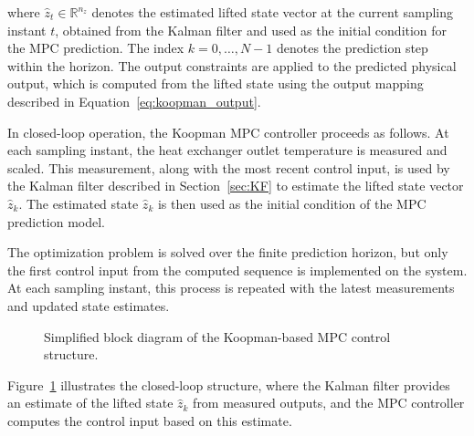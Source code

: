 where $\hat{z}_t \in \mathbb{R}^{n_z}$ denotes the estimated lifted state vector at the current sampling instant $t$, obtained from the Kalman filter and used as the initial condition for the MPC prediction. The index $k = 0,\ldots,N-1$ denotes the prediction step within the horizon. The output constraints are applied to the predicted physical output, which is computed from the lifted state using the output mapping described in Equation~\eqref{eq:koopman_output}.

In closed-loop operation, the Koopman MPC controller proceeds as follows.
At each sampling instant, the heat exchanger outlet temperature is measured and scaled.
This measurement, along with the most recent control input, is used by the Kalman filter described in Section~\ref{sec:KF} to estimate the lifted state vector $\hat{z}_k$.
The estimated state $\hat{z}_k$ is then used as the initial condition of the MPC prediction model.

The optimization problem is solved over the finite prediction horizon, but only the first control input from the computed sequence is implemented on the system. At each sampling instant, this process is repeated with the latest measurements and updated state estimates.


\begin{figure}[htbp]
    \centering
    \def\svgwidth{0.75\textwidth}
    
    \caption{Simplified block diagram of the Koopman-based MPC control structure.}
    \label{fig:koopman_mpc_structure}
  \end{figure}
  

Figure~\ref{fig:koopman_mpc_structure} illustrates the closed-loop structure, where the Kalman filter provides an estimate of the lifted state $\hat{z}_k$ from measured outputs, and the MPC controller computes the control input based on this estimate.

